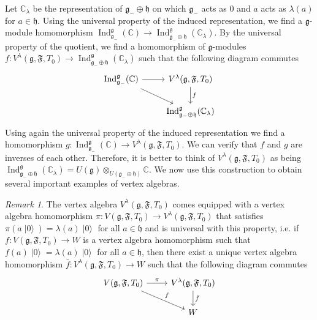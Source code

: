 \documentclass[a4paper, 12pt, reqno]{amsart}
\theoremstyle{remark}
\newtheorem{remark}[theorem]{Remark}
\numberwithin{equation}{subsection}
\DeclareMathOperator{\Ind}{Ind}
\DeclareMathOperator{\vac}{|0\rangle}
\begin{document}
Let $\mathbb{C}_{\lambda}$ be the representation of $\mathfrak{g}_- \oplus \mathfrak{h}$ on which $\mathfrak{g}_-$ acts as $0$ and $a$ acts as $\lambda(a)$ for $a \in \mathfrak{h}$.
Using the universal property of the induced representation, we find a $\mathfrak{g}$-module homomorphism $\Ind^{\mathfrak{g}}_{\mathfrak{g}_-}(\mathbb{C}) \to \Ind^{\mathfrak{g}}_{\mathfrak{g}_- \oplus \mathfrak{h}}(\mathbb{C}_{\lambda})$.
By the universal property of the quotient, we find a homomorphism of $\mathfrak{g}$-modules $f: V^{\lambda}(\mathfrak{g}, \mathfrak{F}, T_0) \to \Ind^{\mathfrak{g}}_{\mathfrak{g}_- \oplus \mathfrak{h}}(\mathbb{C}_{\lambda})$ such that the following diagram commutes
\begin{equation*}
  \begin{tikzcd}
    {\Ind^{\mathfrak{g}}_{\mathfrak{g}_-}(\mathbb{C})} \arrow[rd] \arrow[r] & {V^\lambda(\mathfrak{g}, \mathfrak{F}, T_0)} \arrow[d, "f"] \\
    & \Ind^{\mathfrak{g}}_{\mathfrak{g}_- \oplus \mathfrak{h}}(\mathbb{C}_{\lambda})
  \end{tikzcd}
\end{equation*}
Using again the universal property of the induced representation we find a homomorphism $g: \Ind^{\mathfrak{g}}_{\mathfrak{g}_-}(\mathbb{C}) \to V^{\lambda}(\mathfrak{g}, \mathfrak{F}, T_0)$.
We can verify that $f$ and $g$ are inverses of each other.
Therefore, it is better to think of $V^{\lambda}(\mathfrak{g}, \mathfrak{F}, T_0)$ as being $\Ind^{\mathfrak{g}}_{\mathfrak{g}_- \oplus \mathfrak{h}}(\mathbb{C}_{\lambda}) = U(\mathfrak{g})\otimes_{U(\mathfrak{g}_- \oplus \mathfrak{h})}\mathbb{C}$.
We now use this construction to obtain several important examples of vertex algebras.

\begin{remark}
  \label{rmk:14}
  The vertex algebra $V^{\lambda}(\mathfrak{g}, \mathfrak{F}, T_0)$ comes equipped with a vertex algebra homomorphism $\pi: V(\mathfrak{g}, \mathfrak{F}, T_0) \to V^{\lambda}(\mathfrak{g}, \mathfrak{F}, T_0)$ that satisfies $\pi(a\vac) = \lambda(a)\vac$ for all $a \in \mathfrak{h}$ and is universal with this property, i.e. if $f: V(\mathfrak{g}, \mathfrak{F}, T_0)\to W$ is a vertex algebra homomorphism such that $f(a)\vac = \lambda(a)\vac$ for all $a \in \mathfrak{h}$, then there exist a unique vertex algebra homomorphism $\bar{f}: V^{\lambda}(\mathfrak{g}, \mathfrak{F}, T_0)\to W$ such that the following diagram commutes
  \begin{equation*}
    \begin{tikzcd}
      {V(\mathfrak{g}, \mathfrak{F}, T_0)} \arrow[rd, "f"] \arrow[r, "\pi"] & {V^\lambda(\mathfrak{g}, \mathfrak{F}, T_0)} \arrow[d, "\bar{f}"] \\
      & W                                                    
    \end{tikzcd}
  \end{equation*}
\end{remark}
\end{document}
